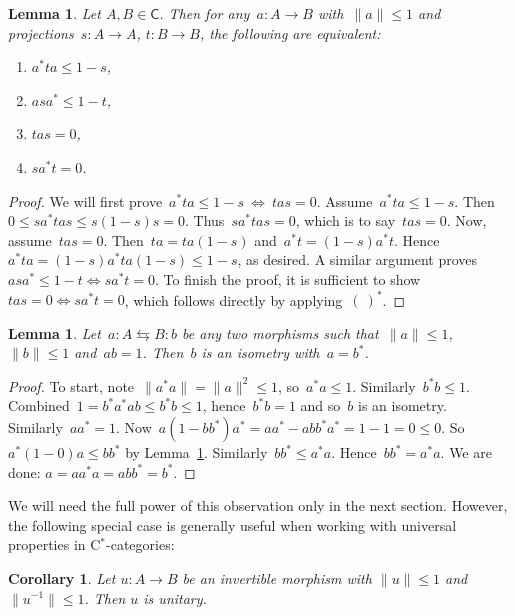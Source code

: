 \documentclass[reqno,T1,11pt]{amsproc}
\newcommand{\cat}[1]{\mathsf{#1}}		%
\theoremstyle{plain}
\newtheorem{lem}[thm]{Lemma}
\newtheorem{cor}[thm]{Corollary}
\theoremstyle{remark}
\numberwithin{equation}{section}
\begin{document}
\begin{lem}
	Let $A,B\in\cat{C}$. Then for any~$a\colon A \to B$ with~$\|a\| \leq 1$
    and projections~$s \colon A \to A$,
        $t\colon B\to B$,
	the following are equivalent:
\begin{enumerate}
\item $a^* t a \leq 1-s$,
\item $a s a^* \leq 1 - t$,
\item $tas = 0$,
\item $sa^* t = 0$.
\end{enumerate}
\label{contrapositionlemma}
\end{lem}
\begin{proof}
We will first prove~$a^*t a \leq 1-s \:\Leftrightarrow\: tas=0$.
    Assume~$a^* t a \leq 1-s$.
    Then~$0 \leq s a^* t a s \leq s (1-s) s = 0$.
    Thus~$s a^* t a s = 0$, which is to say~$tas = 0$.
    Now, assume~$tas = 0$.
    Then~$ta = ta(1-s)$ and~$a^*t = (1-s)a^* t$.
    Hence~$a^* ta = (1-s)a^*ta(1-s) \leq 1-s$, as desired.
A similar argument proves~$as a^* \leq 1-t \Leftrightarrow sa^*t=0$.
To finish the proof, it is sufficient to
        show~$tas=0 \Leftrightarrow sa^*t=0$, which follows directly
        by applying~$(\ )^*$.
\end{proof}

\begin{lem}
Let~$a \colon A \leftrightarrows B \colon b$ be any two morphisms
    such that~$\|a \| \leq 1$, $\| b\| \leq 1$ and~$ab=1$.
    Then~$b$ is an isometry with~$a=b^*$.
\label{isometrylemma}
\end{lem}
\begin{proof}
    To start, note~$\|a ^*a\| = \|a\|^2 \leq 1$, so~$a^*a \leq 1$.
    Similarly~$b^*b \leq 1$.
    Combined~$1 = b^*a^*ab \leq b^*b \leq 1$, hence~$b^*b=1$
        and so~$b$ is an isometry.
    Similarly~$aa^*=1$.
    Now~$a (1-bb^*) a^* = aa^* - abb^*a^* = 1-1=0 \leq 0$.
    So~$a^* (1-0) a \leq bb^*$ by Lemma~\ref{contrapositionlemma}.
    Similarly~$bb^* \leq a^*a$. Hence~$bb^*=a^*a$.
    We are done: $a = aa^*a=abb^*=b^*$.
\end{proof}

We will need the full power of this observation only in the next section. However, the following special case is generally useful when working with universal properties in C$^*$-categories:

\begin{cor}
Let $u : A \to B$ be an invertible morphism with $\| u \| \leq 1$ and $\| u^{-1} \| \leq 1$. Then $u$ is unitary.
\label{unitaries}
\end{cor}
\end{document}

